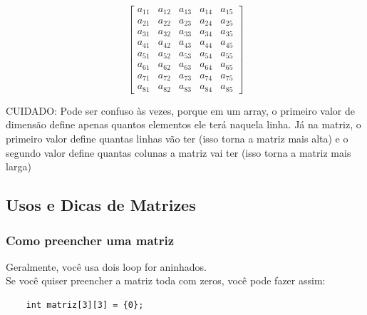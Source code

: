 \documentclass{article}
\begin{document}
\[
\begin{bmatrix}
a_{11} & a_{12} & a_{13} & a_{14} & a_{15} \\
a_{21} & a_{22} & a_{23} & a_{24} & a_{25} \\
a_{31} & a_{32} & a_{33} & a_{34} & a_{35} \\
a_{41} & a_{42} & a_{43} & a_{44} & a_{45} \\
a_{51} & a_{52} & a_{53} & a_{54} & a_{55} \\
a_{61} & a_{62} & a_{63} & a_{64} & a_{65} \\
a_{71} & a_{72} & a_{73} & a_{74} & a_{75} \\
a_{81} & a_{82} & a_{83} & a_{84} & a_{85}
\end{bmatrix}
\]

CUIDADO: Pode ser confuso às vezes, porque em um array, o primeiro valor de dimensão define apenas quantos elementos ele terá naquela linha. Já na matriz, o primeiro valor define quantas linhas vão ter (isso torna a matriz mais alta) e o segundo valor define quantas colunas a matriz vai ter (isso torna a matriz mais larga)

\subsection{Usos e Dicas de Matrizes}

\subsubsection{Como preencher uma matriz}
Geralmente, você usa dois loop for aninhados.
\\[5pt]
Se você quiser preencher a matriz toda com zeros, você pode fazer assim:
\begin{lstlisting}
    int matriz[3][3] = {0};
\end{lstlisting}
\end{document}
